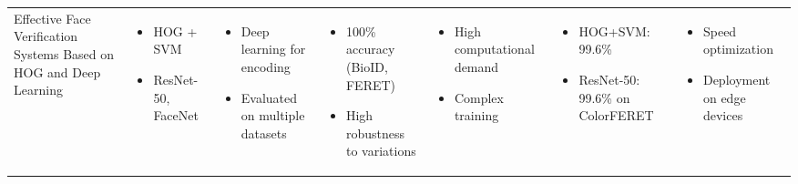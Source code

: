 \documentclass{article}
\begin{document}
\begin{adjustbox}{width=\textwidth}
\begin{tabular}{|p{}|p{}|p{}|p{}|p{}|p{}|p{}|}
    \hline
    Effective Face Verification Systems Based on HOG and Deep Learning & 
    \begin{itemize}[leftmargin=*]
        \item HOG + SVM
        \item ResNet-50, FaceNet
    \end{itemize} & 
    \begin{itemize}[leftmargin=*]
        \item Deep learning for encoding
        \item Evaluated on multiple datasets
    \end{itemize} & 
    \begin{itemize}[leftmargin=*]
        \item 100\% accuracy (BioID, FERET)
        \item High robustness to variations
    \end{itemize} & 
    \begin{itemize}[leftmargin=*]
        \item High computational demand
        \item Complex training
    \end{itemize} & 
    \begin{itemize}[leftmargin=*]
        \item HOG+SVM: 99.6\%
        \item ResNet-50: 99.6\% on ColorFERET
    \end{itemize} & 
    \begin{itemize}[leftmargin=*]
        \item Speed optimization
        \item Deployment on edge devices
    \end{itemize} \\
    

\end{tabular}
\end{adjustbox}
\end{document}
